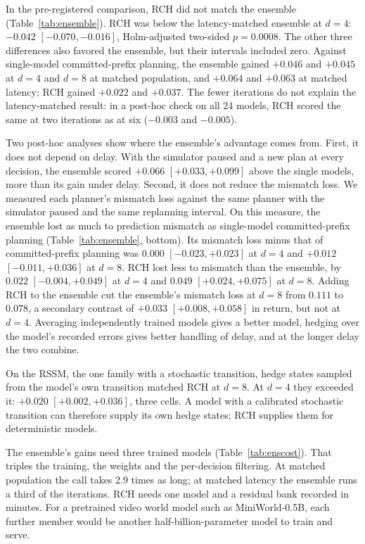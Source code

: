 \documentclass[aps,physrev,\manuscriptlayout,superscriptaddress,
  longbibliography,amsmath,amssymb]{revtex4-2}
\begin{document}
In the pre-registered comparison, RCH did not match the ensemble (Table~\ref{tab:ensemble}). RCH was below the latency-matched ensemble at $d=4$: $-0.042$ $[-0.070, -0.016]$, Holm-adjusted two-sided $p=0.0008$. The other three differences also favored the ensemble, but their intervals included zero. Against single-model committed-prefix planning, the ensemble gained $+0.046$ and $+0.045$ at $d=4$ and $d=8$ at matched population, and $+0.064$ and $+0.063$ at matched latency; RCH gained $+0.022$ and $+0.037$. The fewer iterations do not explain the latency-matched result: in a post-hoc check on all 24 models, RCH scored the same at two iterations as at six ($-0.003$ and $-0.005$).

Two post-hoc analyses show where the ensemble's advantage comes from. First, it does not depend on delay. With the simulator paused and a new plan at every decision, the ensemble scored $+0.066$ $[+0.033, +0.099]$ above the single models, more than its gain under delay. Second, it does not reduce the mismatch loss. We measured each planner's mismatch loss against the same planner with the simulator paused and the same replanning interval. On this measure, the ensemble lost as much to prediction mismatch as single-model committed-prefix planning (Table~\ref{tab:ensemble}, bottom). Its mismatch loss minus that of committed-prefix planning was $0.000$ $[-0.023, +0.023]$ at $d=4$ and $+0.012$ $[-0.011, +0.036]$ at $d=8$. RCH lost less to mismatch than the ensemble, by $0.022$ $[-0.004, +0.049]$ at $d=4$ and $0.049$ $[+0.024, +0.075]$ at $d=8$. Adding RCH to the ensemble cut the ensemble's mismatch loss at $d=8$ from $0.111$ to $0.078$, a secondary contrast of $+0.033$ $[+0.008, +0.058]$ in return, but not at $d=4$. Averaging independently trained models gives a better model, hedging over the model's recorded errors gives better handling of delay, and at the longer delay the two combine.

On the RSSM, the one family with a stochastic transition, hedge states sampled from the model's own transition matched RCH at $d=8$. At $d=4$ they exceeded it: $+0.020$ $[+0.002, +0.036]$, three cells. A model with a calibrated stochastic transition can therefore supply its own hedge states; RCH supplies them for deterministic models.

The ensemble's gains need three trained models (Table~\ref{tab:enscost}). That triples the training, the weights and the per-decision filtering. At matched population the call takes 2.9 times as long; at matched latency the ensemble runs a third of the iterations. RCH needs one model and a residual bank recorded in minutes. For a pretrained video world model such as MiniWorld-0.5B, each further member would be another half-billion-parameter model to train and serve.
\end{document}
